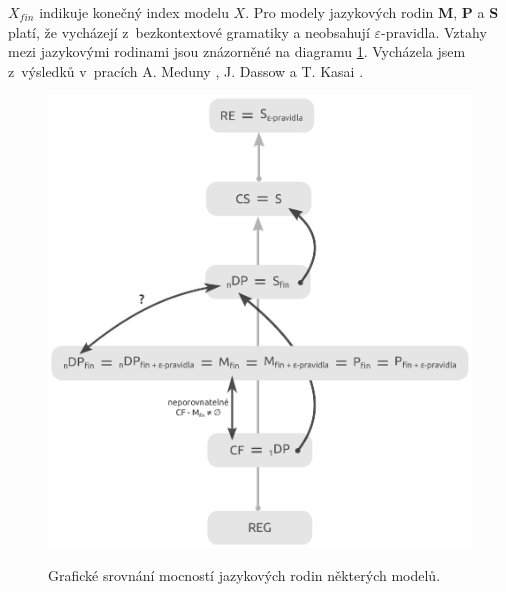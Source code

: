 $X_{fin}$ indikuje konečný index modelu $X$. Pro modely jazykových rodin \textbf{M}, \textbf{P} a \textbf{S} platí, že vycházejí z~bezkontextové gramatiky a neobsahují $\varepsilon$-pravidla.
Vztahy mezi jazykovými rodinami jsou znázorněné na diagramu \ref{obr_model_hierarchy}. Vycházela jsem z~výsledků v~pracích
A. Meduny \cite{Meduna:DeepPDA, Meduna:FinitelyDeepPDA, Meduna:StateGrammars}, 
J. Dassow \cite{Dassow:RegulatedRewriting} a 
T. Kasai \cite{Kasai:Hierarchy}.


\begin{figure}[ht]
\centering
\includegraphics{img/bp_hierarchy02.eps} \bigskip \\
\caption{Grafické srovnání mocností jazykových rodin některých modelů.}
\label{obr_model_hierarchy}
\end{figure}




